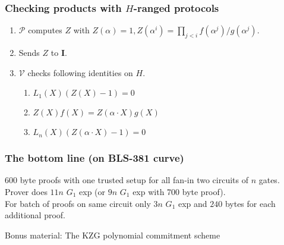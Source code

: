 \documentclass[shadesubsections,trans,14pt,mathserif]{beamer}
\newcommand{\ver}{\ensuremath{\mathcal{V}}}
\newcommand{\prv}{\ensuremath{\mathcal{P}}}
\newcommand{\ideal}{\mathbf{I}}
\newcommand{\gen}{\alpha}
\begin{document}
\begin{frame}
\frametitle{Checking products with $H$-ranged protocols}   %
 \begin{enumerate}
  \item $\prv$ computes $Z$ with 
  $ Z(\gen)=1, Z(\gen^i) = \prod_{j<i}  f(\gen^j)/g(\gen^j)$.
  \item Sends $Z$ to $\ideal$.
  \item $\ver$ checks following identities on $H$.
  \begin{enumerate}
   \item $L_1(X) (Z(X)-1) =0$
   \item $Z(X) f(X) = Z(\gen\cdot X)g(X)$
 \item $L_n(X) (Z(\gen\cdot X) -1)=0$ 
 \end{enumerate}

 \end{enumerate}


\end{frame}




\begin{frame}
\frametitle{The bottom line {\normalsize{(on BLS-381 curve)}}}   %
 600 byte proofs with one trusted setup for all fan-in two circuits of $n$ gates.\\
  \vspace{0.2in}
Prover does $11n$ $G_1$ exp {\small{(or $9n$ $G_1$ exp with 700 byte proof)}}.\\
  \vspace{0.2in}
For batch of proofs on same circuit only $3n$ $G_1$ exp and $240$ bytes for each additional proof.
 

\end{frame}


\begin{frame}
\large{Bonus material: The KZG polynomial commitment scheme
}

\end{frame}
\end{document}
